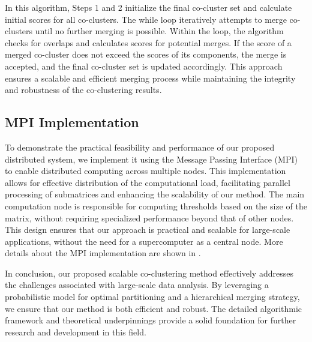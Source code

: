 \documentclass[journal]{IEEEtran}
\begin{document}
In this algorithm, Steps 1 and 2 initialize the final co-cluster set and calculate initial scores for all co-clusters. The while loop iteratively attempts to merge co-clusters until no further merging is possible. Within the loop, the algorithm checks for overlaps and calculates scores for potential merges. If the score of a merged co-cluster does not exceed the scores of its components, the merge is accepted, and the final co-cluster set is updated accordingly. This approach ensures a scalable and efficient merging process while maintaining the integrity and robustness of the co-clustering results.

\subsection{MPI Implementation}

To demonstrate the practical feasibility and performance of our proposed distributed system, we implement it using the Message Passing Interface (MPI) to enable distributed computing across multiple nodes. This implementation allows for effective distribution of the computational load, facilitating parallel processing of submatrices and enhancing the scalability of our method. The main computation node is responsible for computing thresholds based on the size of the matrix, without requiring specialized performance beyond that of other nodes. This design ensures that our approach is practical and scalable for large-scale applications, without the need for a supercomputer as a central node.
More details about the MPI implementation are shown in .

In conclusion, our proposed scalable co-clustering method effectively addresses the challenges associated with large-scale data analysis. By leveraging a probabilistic model for optimal partitioning and a hierarchical merging strategy, we ensure that our method is both efficient and robust. The detailed algorithmic framework and theoretical underpinnings provide a solid foundation for further research and development in this field.
\end{document}
